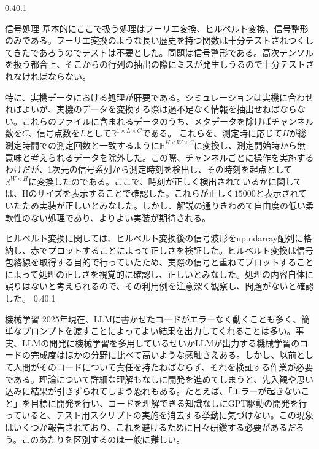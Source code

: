 \documentclass[uplatex]{suribt}
\makeatletter
\renewcommand{\subsection}{%
    \@startsection{subsection}{1}{\z@}%
    {0.4\Cvs}{0.1\Cvs}%
    {\normalfont\normalsize\headfont\raggedright}}
\makeatother
\begin{document}
\subsection{信号処理}
基本的にここで扱う処理はフーリエ変換、ヒルベルト変換、信号整形のみである。フーリエ変換のような長い歴史を持つ関数は十分テストされつくしてきたであろうのでテストは不要とした。問題は信号整形である。高次テンソルを扱う都合上、そこからの行列の抽出の際にミスが発生しうるので十分テストされなければならない。\par
特に、実機データにおける処理が肝要である。シミュレーションは実機に合わせればよいが、実機のデータを変換する際は過不足なく情報を抽出せねばならない。これらのファイルに含まれるデータのうち、メタデータを除けばチャンネル数を$C$、信号点数を$L$として$\mathbb{R}^{1\times L \times C}$である。 これらを、測定時に応じて$H$が総測定時間での測定回数と一致するように$\mathbb{R}^{H\times W \times C}$に変換し、測定開始時から無意味と考えられるデータを除外した。この際、チャンネルごとに操作を実施するわけだが、1次元の信号系列から測定時刻を検出し、その時刻を起点として$\mathbb{R}^{W\times H}$に変換したのである。ここで、時刻が正しく検出されているかに関しては、Hのサイズを表示することで確認した。これらが正しく$15000$と表示されていたため実装が正しいとみなした。しかし、解説の通りきわめて自由度の低い柔軟性のない処理であり、よりよい実装が期待される。\par
ヒルベルト変換に関しては、ヒルベルト変換後の信号波形をnp.ndarray配列に格納し、赤でプロットすることによって正しさを検証した。ヒルベルト変換は信号包絡線を取得する目的で行っていたため、実際の信号と重ねてプロットすることによって処理の正しさを視覚的に確認し、正しいとみなした。処理の内容自体に誤りはないと考えられるので、その利用例を注意深く観察し、問題がないと確認した。\subsection{機械学習}
2025年現在、LLMに書かせたコードがエラーなく動くことも多く、簡単なプロンプトを渡すことによってよい結果を出力してくれることは多い。事実、LLMの開発に機械学習を多用しているせいかLLMが出力する機械学習のコードの完成度はほかの分野に比べて高いような感触さえある。しかし、以前として人間がそのコードについて責任を持たねばならず、それを検証する作業が必要である。理論について詳細な理解もなしに開発を進めてしまうと、先入観や思い込みに結果が引きずられてしまう恐れもある。たとえば、「エラーが起きないこと」を目標に開発を行い、コードを理解できる知識なしにGPT駆動の開発を行っていると、テスト用スクリプトの実施を消去する挙動に気づけない。この現象はいくつか報告されており、これを避けるために日々研鑽する必要があるだろう。このあたりを区別するのは一般に難しい。
\end{document}
